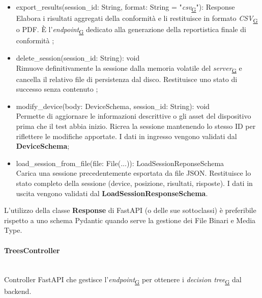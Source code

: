 \documentclass[a4paper,12pt]{article}
\begin{document}
\begin{itemize}
                        \item {\ttfamily export\_results(session\_id: String, format: String = "\textit{csv}\textsubscript{\href{https://atlasteam9.github.io/Atlas/glossario.html\#CSV}{G}}"): Response} \\ Elabora i risultati aggregati della conformità e li restituisce in formato \textit{CSV}\textsubscript{\href{https://atlasteam9.github.io/Atlas/glossario.html\#CSV}{G}} o PDF. È l'\textit{endpoint}\textsubscript{\href{https://atlasteam9.github.io/Atlas/glossario.html\#Endpoint}{G}} dedicato alla generazione della reportistica finale di conformità ; 
                        \item {\ttfamily delete\_session(session\_id: String): void} \\ Rimuove definitivamente la sessione dalla memoria volatile del \textit{server}\textsubscript{\href{https://atlasteam9.github.io/Atlas/glossario.html\#Server}{G}} e cancella il relativo file di persistenza dal disco. Restituisce uno stato di successo senza contenuto ;
                        \item {\ttfamily modify\_device(body: DeviceSchema, session\_id: String):  void} \\ Permette di aggiornare le informazioni descrittive o gli asset del dispositivo prima che il test abbia inizio. Ricrea la sessione mantenendo lo stesso ID per riflettere le modifiche apportate. I dati in ingresso vengono validati dal \textbf{DeviceSchema};
                        \item {\ttfamily load\_session\_from\_file(file: File(...)):  LoadSessionReponseSchema} \\ Carica una sessione precedentemente esportata da file JSON. Restituisce lo stato completo della sessione (device, posizione, risultati, risposte). I dati in uscita vengono validati dal \textbf{LoadSessionResponseSchema}.
                    \end{itemize}

                    L'utilizzo della classe \textbf{Response} di FastAPI (o delle sue sottoclassi) è preferibile rispetto a uno schema Pydantic quando  serve la gestione dei File Binari e Media Type. 
                    
                \paragraph{TreesController}\mbox{}\\
                    Controller FastAPI che gestisce l'\textit{endpoint}\textsubscript{\href{https://atlasteam9.github.io/Atlas/glossario.html\#Endpoint}{G}} per ottenere i \textit{decision tree}\textsubscript{\href{https://atlasteam9.github.io/Atlas/glossario.html\#DecisionTree}{G}} dal backend.
\end{document}

